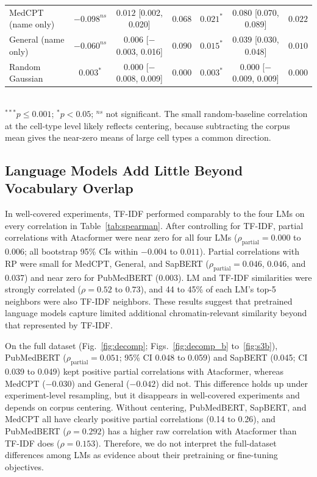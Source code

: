 \documentclass[12pt]{article}
\begin{document}
\begin{table}[!htbp]
{\begin{tabular}{l ccc ccc}
    MedCPT (name only)       & $-0.098^{ns}$  & $0.012$ [0.002, 0.020]    & $0.068$ & $0.021^{*}$   & $0.080$ [0.070, 0.089]    & $0.022$ \\
    General (name only)      & $-0.060^{ns}$  & $0.006$ [$-$0.003, 0.016] & $0.090$ & $0.015^{*}$   & $0.039$ [0.030, 0.048]    & $0.010$ \\
    Random Gaussian          & $0.003^{*}$    & $0.000$ [$-$0.008, 0.009] & $0.000$ & $0.003^{*}$   & $0.000$ [$-$0.009, 0.009] & $0.000$ \\
    \bottomrule
  \end{tabular}}
  \\[3pt]
  {\footnotesize $^{***}p \leq 0.001$; $^{*}p < 0.05$; $^{ns}$ not significant.
  The small random-baseline correlation at the cell-type level likely reflects
  centering, because subtracting the corpus mean gives the near-zero means of
  large cell types a common direction.}
\end{table}

\subsection{Language Models Add Little Beyond Vocabulary Overlap}
\label{sec:partial_corr}

In well-covered experiments, TF-IDF performed comparably to the four LMs on
every correlation in Table~\ref{tab:spearman}. After controlling for TF-IDF,
partial correlations with Atacformer were near zero for all four LMs
($\rho_{\mathrm{partial}} = 0.000$ to $0.006$; all bootstrap 95\% CIs within
$-0.004$ to $0.011$). Partial correlations with RP were small for MedCPT,
General, and SapBERT ($\rho_{\mathrm{partial}} = 0.046$, 0.046, and 0.037) and
near zero for PubMedBERT (0.003). LM and TF-IDF similarities were strongly
correlated ($\rho = 0.52$ to $0.73$), and 44 to 45\% of each LM's top-5
neighbors were also TF-IDF neighbors. These results suggest that pretrained
language models capture limited additional chromatin-relevant similarity
beyond that represented by TF-IDF.

On the full dataset (Fig.~\ref{fig:decomp}; Figs.~\ref{fig:decomp_b}
to~\ref{fig:s3b}), PubMedBERT ($\rho_{\mathrm{partial}} = 0.051$; 95\% CI
0.048 to 0.059) and SapBERT (0.045; CI 0.039 to 0.049) kept positive partial
correlations with Atacformer, whereas MedCPT ($-0.030$) and General
($-0.042$) did not. This difference holds up under experiment-level
resampling, but it disappears in well-covered experiments and depends on
corpus centering. Without centering, PubMedBERT, SapBERT, and MedCPT all have
clearly positive partial correlations (0.14 to 0.26), and PubMedBERT
($\rho = 0.292$) has a higher raw correlation with Atacformer than TF-IDF does
($\rho = 0.153$). Therefore, we do not interpret the full-dataset differences
among LMs as evidence about their pretraining or fine-tuning objectives.
\end{document}
